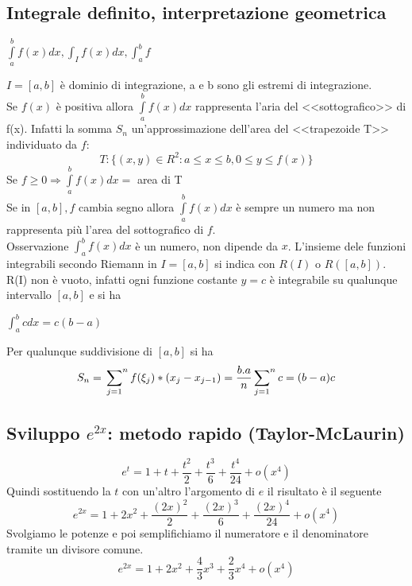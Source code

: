 \subsection{Integrale definito, interpretazione geometrica}
\begin{center}
	$\int\limits^b_af(x)dx, \int_If(x)dx,\int^b_af$
\end{center}
$I=[a,b]$ è dominio di integrazione, a e b sono gli estremi di integrazione.\\
Se $f(x)$ è positiva allora $\int\limits^b_a f(x)dx$ rappresenta l'aria del <<sottografico>> di f(x). Infatti la somma $S_n$ un'approssimazione dell'area del <<trapezoide T>> individuato da $f$:
\begin{equation*}
	T: \{(x,y)\in R^2: a\leq x\leq b, 0\leq y\leq f(x)\}
\end{equation*}
Se $f\geq 0\Rightarrow \int\limits_a^b f(x)dx=$ area di T\\
Se in $[a,b], f$ cambia segno allora $\int\limits^b_a f(x)dx$ è sempre un numero ma non rappresenta più l'area del sottografico di $f$.\\
Osservazione $\int^b_af(x)dx$ è un numero, non dipende da $x$. L'insieme dele funzioni integrabili secondo Riemann in $I=[a,b]$ si indica con $R(I)$ o $R([a,b])$.\\
R(I) non è vuoto, infatti ogni funzione costante $y=c$ è integrabile su qualunque intervallo $[a,b]$ e si ha
\begin{center}
	$\int^b_a c dx=c(b-a)$
\end{center}
Per qualunque suddivisione di $[a,b]$ si ha
\begin{equation*}
	S_n=\sideset{}{^n}\sum_{j=1}f(\xi_j)*(x_j-x_{j-1})=\frac{b.a}{n}\sideset{}{^n}\sum_{j=1}c=(b-a)c
\end{equation*}
\subsection{Sviluppo $e^{2x}$: metodo rapido (Taylor-McLaurin)}
\begin{equation*}
	e^t=1+t+\frac{t^2}{2}+\frac{t^3}{6}+\frac{t^4}{24}+o(x^4)
\end{equation*}
Quindi sostituendo la $t$ con un'altro l'argomento di $e$ il risultato è il seguente
\begin{equation*}
	e^{2x}=1+2x^2+\frac{(2x)^2}{2}+\frac{(2x)^3}{6}+\frac{(2x)^4}{24}+o(x^4)
\end{equation*}
Svolgiamo le potenze e poi semplifichiamo il numeratore e il denominatore tramite un divisore comune.
\begin{equation*}
	e^{2x}=1+2x^2+\frac{4}{3}x^3+\frac{2}{3}x^4+o(x^4)
\end{equation*}

